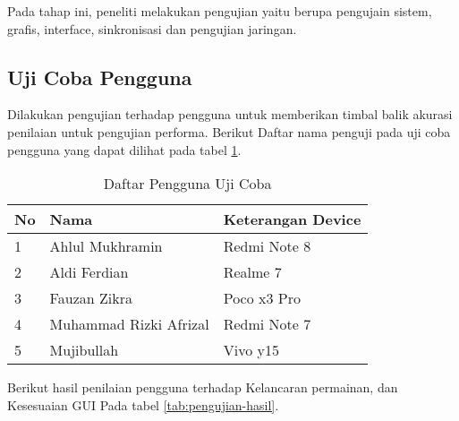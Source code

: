 Pada tahap ini, peneliti melakukan pengujian yaitu berupa pengujain sistem, grafis, interface, sinkronisasi dan pengujian jaringan.

\subsection{Uji Coba Pengguna}
\noindent

Dilakukan pengujian terhadap pengguna untuk 
memberikan timbal balik akurasi penilaian untuk pengujian 
performa. Berikut Daftar nama penguji pada uji coba pengguna 
yang dapat dilihat pada tabel \ref{tab:pengguna-uji}.
\newpage

\begin{table}[h]
    \centering
    \caption{Daftar Pengguna Uji Coba}
    \label{tab:pengguna-uji}
    \begin{tabular}{|l|l|l|}
    \hline
    \textbf{No} & \textbf{Nama}          & \textbf{Keterangan Device} \\ \hline
    1           & Ahlul Mukhramin        & Redmi Note 8               \\ \hline
    2           & Aldi Ferdian           & Realme 7                   \\ \hline
    3           & Fauzan Zikra           & Poco x3 Pro                    \\ \hline
    4           & Muhammad Rizki Afrizal & Redmi Note 7               \\ \hline
    5           & Mujibullah             & Vivo y15                   \\ \hline
    \end{tabular}
    \end{table}

Berikut hasil penilaian pengguna terhadap Kelancaran permainan, dan Kesesuaian GUI Pada tabel \ref{tab:pengujian-hasil}.


